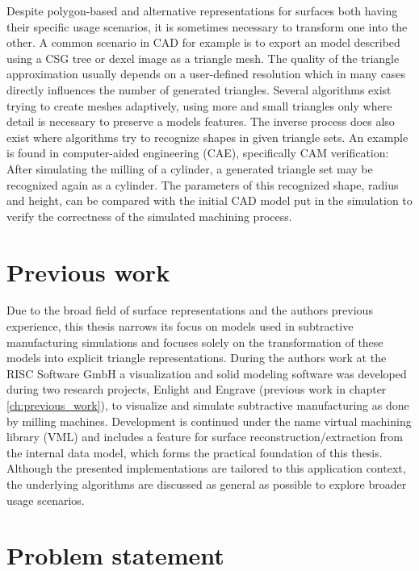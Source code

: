 Despite polygon-based and alternative representations for surfaces both having their specific usage scenarios, it is sometimes necessary to transform one into the other.
A common scenario in CAD for example is to export an model described using a CSG tree or dexel image as a triangle mesh.
The quality of the triangle approximation usually depends on a user-defined resolution which in many cases directly influences the number of generated triangles.
Several algorithms exist trying to create meshes adaptively, using more and small triangles only where detail is necessary to preserve a models features.
%
The inverse process does also exist where algorithms try to recognize shapes in given triangle sets.
An example is found in computer-aided engineering (CAE), specifically CAM verification: After simulating the milling of a cylinder, a generated triangle set may be recognized again as a cylinder. The parameters of this recognized shape, \eg radius and height, can be compared with the initial CAD model put in the simulation to verify the correctness of the simulated machining process.


\section{Previous work}

Due to the broad field of surface representations and the authors previous experience, this thesis narrows its focus on models used in subtractive manufacturing simulations and focuses solely on the transformation of these models into explicit triangle representations.
During the authors work at the RISC Software GmbH a visualization and solid modeling software was developed during two research projects, Enlight and Engrave (\cf previous work in chapter \ref{ch:previous_work}), to visualize and simulate subtractive manufacturing as done by milling machines.
Development is continued under the name virtual machining library (VML) and includes a feature for surface reconstruction/extraction from the internal data model, which forms the practical foundation of this thesis.
Although the presented implementations are tailored to this application context, the underlying algorithms are discussed as general as possible to explore broader usage scenarios.


\section{Problem statement}
\label{sec:problem}

